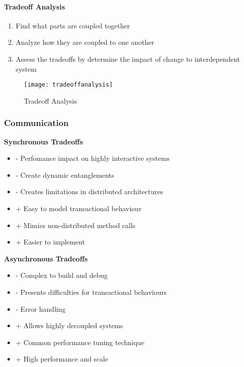 \paragraph{Tradeoff Analysis} 
\begin{enumerate}
	\item Find what parts are coupled together
	\item Analyze how they are coupled to one another
	\item Assess the tradeoffs by determine the impact of change to interdependent system
\end{enumerate}

\begin{figure}[H]
  \center
  \texttt{[image: tradeoffanalysis]}
  \caption{Tradeoff Analysis}
\end{figure}

\subsubsection{Communication}

\begin{minipage}[t]{0.5\textwidth}
	\textbf{Synchronous Tradeoffs}
	\begin{itemize}
		\item - Perfomance impact on highly interactive systems
		\item - Create dynamic entanglements
		\item - Creates limitations in distributed architectures
		\item + Easy to model transactional behaviour
		\item + Mimics non-distributed method calls
		\item + Easier to implement
	\end{itemize}
\end{minipage}
\begin{minipage}[t]{0.5\textwidth}
	\textbf{Asynchronous Tradeoffs}
	\begin{itemize}
		\item - Complex to build and debug
		\item - Presents difficulties for transactional behaviours
		\item - Error handling
		\item + Allows highly decoupled systems
		\item + Common performance tuning technique
		\item + High performance and scale
	\end{itemize}
\end{minipage}

